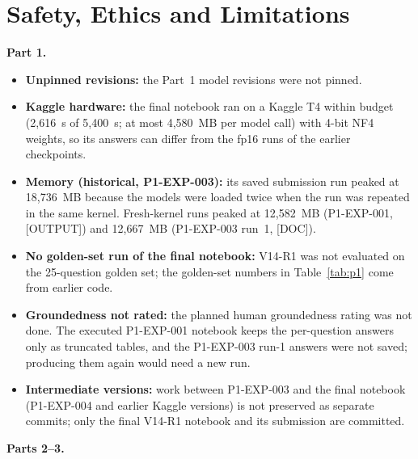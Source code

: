 \documentclass[conference]{IEEEtran}
\begin{document}
\section{Safety, Ethics and Limitations}\label{sec:limits}
\textbf{Part 1.}
\begin{itemize}
\item \textbf{Unpinned revisions:} the Part~1 model revisions were not pinned.
\item \textbf{Kaggle hardware:} the final notebook ran on a Kaggle T4 within budget (2{,}616~s of 5{,}400~s; at most 4{,}580~MB per model call) with 4-bit NF4 weights, so its answers can differ from the fp16 runs of the earlier checkpoints.
\item \textbf{Memory (historical, P1-EXP-003):} its saved submission run peaked at 18{,}736~MB because the models were loaded twice when the run was repeated in the same kernel. Fresh-kernel runs peaked at 12{,}582~MB (P1-EXP-001, [OUTPUT]) and 12{,}667~MB (P1-EXP-003 run~1, [DOC]).
\item \textbf{No golden-set run of the final notebook:} V14-R1 was not evaluated on the 25-question golden set; the golden-set numbers in Table~\ref{tab:p1} come from earlier code.
\item \textbf{Groundedness not rated:} the planned human groundedness rating was not done. The executed P1-EXP-001 notebook keeps the per-question answers only as truncated tables, and the P1-EXP-003 run-1 answers were not saved; producing them again would need a new run.
\item \textbf{Intermediate versions:} work between P1-EXP-003 and the final notebook (P1-EXP-004 and earlier Kaggle versions) is not preserved as separate commits; only the final V14-R1 notebook and its submission are committed.
\end{itemize}
\textbf{Parts 2--3.}
\end{document}
